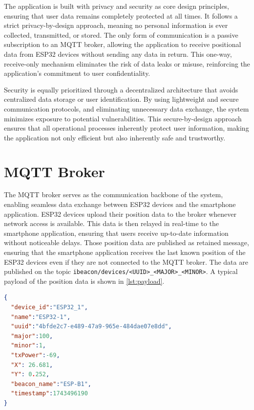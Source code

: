 The application is built with privacy and security as core design principles, ensuring that user data remains completely protected at all times. It follows a strict privacy-by-design approach, meaning no personal information is ever collected, transmitted, or stored. The only form of communication is a passive subscription to an MQTT broker, allowing the application to receive positional data from ESP32 devices without sending any data in return. This one-way, receive-only mechanism eliminates the risk of data leaks or misuse, reinforcing the application's commitment to user confidentiality. 

Security is equally prioritized through a decentralized architecture that avoids centralized data storage or user identification. By using lightweight and secure communication protocols, and eliminating unnecessary data exchange, the system minimizes exposure to potential vulnerabilities. This secure-by-design approach ensures that all operational processes inherently protect user information, making the application not only efficient but also inherently safe and trustworthy. 

\section{MQTT Broker}
	The MQTT broker serves as the communication backbone of the system, enabling seamless data exchange between ESP32 devices and the smartphone application. ESP32 devices upload their position data to the broker whenever network access is available. This data is then relayed in real-time to the smartphone application, ensuring that users receive up-to-date information without noticeable delays. Those position data are published as retained message, ensuring that the smartphone application receives the last known position of the ESP32 devices even if they are not connected to the MQTT broker. The data are published on the topic \texttt{ibeacon/devices/<UUID>\_<MAJOR>\_<MINOR>}. A typical payload of the position data is shown in \autoref{lst:payload}.

\begin{lstlisting}[language=json, caption={Payload of the position data}, label={lst:payload}]
{
  "device_id":"ESP32_1",
  "name":"ESP32-1",
  "uuid":"4bfde2c7-e489-47a9-965e-484dae07e8dd",
  "major":100,
  "minor":1,
  "txPower":-69,
  "X": 26.681,
  "Y": 0.252,
  "beacon_name":"ESP-B1",
  "timestamp":1743496190
}
\end{lstlisting}

